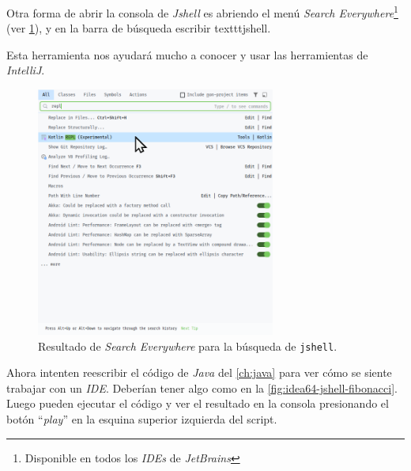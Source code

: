     \begin{tcolorbox}[enhanced, breakable, title=\textit{Search Everywere}]
      Otra forma de abrir la consola de \textit{Jshell} es abriendo el menú \textit{Search 
      Everywhere}\footnote{Disponible en todos los \textit{IDEs} de \textit{JetBrains}} 
      (ver \cref{fig:idea64-search-everywhere}), y en la barra de búsqueda escribir 
      texttt{jshell}.

      Esta herramienta nos ayudará mucho a conocer y usar las herramientas de \textit{IntelliJ}.

      \begin{figure}[H]
        \centering
        \includegraphics[width=0.7\textwidth]{img/Por_algo_se_empieza/idea64_search_everywhere.png}
        \caption{Resultado de \textit{Search Everywhere} para la búsqueda de \texttt{jshell}.}
        \label{fig:idea64-search-everywhere}
      \end{figure}
    \end{tcolorbox}

    Ahora intenten reescribir el código de \textit{Java} del \cref{ch:java} para ver cómo se 
    siente trabajar con un \textit{IDE}.
    Deberían tener algo como en la \cref{fig:idea64-jshell-fibonacci}.
    Luego pueden ejecutar el código y ver el resultado en la consola presionando el botón 
    \enquote{\textit{play}} en la esquina superior izquierda del script.

